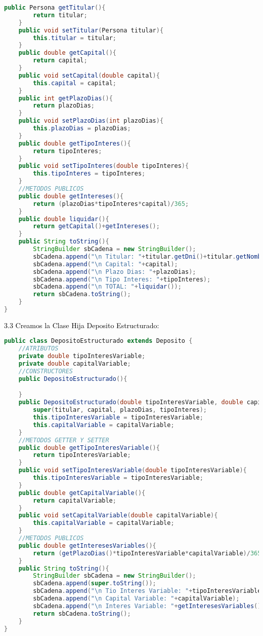 \documentclass{article}
\begin{document}
\begin{itemize}
\begin{itemize}
\begin{lstlisting}[language=java]
    public Persona getTitular(){
        return titular;
    }
    public void setTitular(Persona titular){
        this.titular = titular;
    }
    public double getCapital(){
        return capital;
    }
    public void setCapital(double capital){
        this.capital = capital;
    }
    public int getPlazoDias(){
        return plazoDias;
    }
    public void setPlazoDias(int plazoDias){
        this.plazoDias = plazoDias;
    }
    public double getTipoInteres(){
        return tipoInteres;
    }
    public void setTipoInteres(double tipoInteres){
        this.tipoInteres = tipoInteres;
    }
    //METODOS PUBLICOS
    public double getIntereses(){
        return (plazoDias*tipoInteres*capital)/365;
    }
    public double liquidar(){
        return getCapital()+getIntereses();
    }
    public String toString(){
        StringBuilder sbCadena = new StringBuilder();
        sbCadena.append("\n Titular: "+titular.getDni()+titular.getNombre());
        sbCadena.append("\n Capital: "+capital);
        sbCadena.append("\n Plazo Dias: "+plazoDias);
        sbCadena.append("\n Tipo Interes: "+tipoInteres);
        sbCadena.append("\n TOTAL: "+liquidar());
        return sbCadena.toString();
    }
}
        \end{lstlisting}
        \textcolor{black}{3.3 Creamos la Clase Hija Deposito Estructurado:}
        \begin{lstlisting}[language=java]
public class DepositoEstructurado extends Deposito {
    //ATRIBUTOS
    private double tipoInteresVariable;
    private double capitalVariable;
    //CONSTRUCTORES
    public DepositoEstructurado(){

    }
    public DepositoEstructurado(double tipoInteresVariable, double capitalVariable, Persona titular, double capital, int plazoDias, double tipoInteres){
        super(titular, capital, plazoDias, tipoInteres);
        this.tipoInteresVariable = tipoInteresVariable;
        this.capitalVariable = capitalVariable;
    }
    //METODOS GETTER Y SETTER
    public double getTipoInteresVariable(){
        return tipoInteresVariable;
    }
    public void setTipoInteresVariable(double tipoInteresVariable){
        this.tipoInteresVariable = tipoInteresVariable;
    }
    public double getCapitalVariable(){
        return capitalVariable;
    }
    public void setCapitalVariable(double capitalVariable){
        this.capitalVariable = capitalVariable;
    }
    //METODOS PUBLICOS
    public double getInteresesVariables(){
        return (getPlazoDias()*tipoInteresVariable*capitalVariable)/365;
    }
    public String toString(){
        StringBuilder sbCadena = new StringBuilder();
        sbCadena.append(super.toString());
        sbCadena.append("\n Tio Interes Variable: "+tipoInteresVariable);
        sbCadena.append("\n Capital Variable: "+capitalVariable);
        sbCadena.append("\n Interes Variable: "+getInteresesVariables());
        return sbCadena.toString();
    }
}


\end{lstlisting}
\end{itemize}
\end{itemize}
\end{document}
